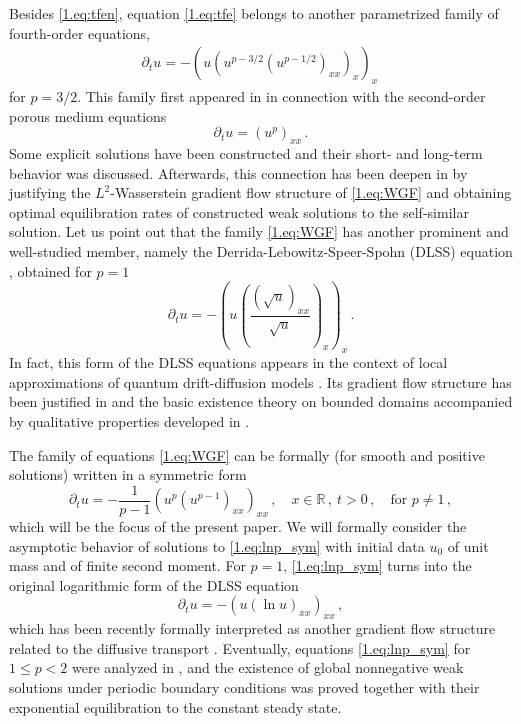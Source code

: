 \documentclass[12pt]{amsart}
\let\pa\partial
\newcommand{\R}{{\mathbb R}}
\theoremstyle{plain}
\theoremstyle{definition}
\theoremstyle{remark}
\begin{document}
Besides \eqref{1.eq:tfen}, equation \eqref{1.eq:tfe} belongs to another parametrized family of fourth-order equations, 
\begin{align}\label{1.eq:WGF}
    \pa_t u = -%
    \left(u\left(u^{p-3/2}(u^{p-1/2})_{xx}\right)_x\right)_x\,
\end{align}
for $p=3/2$. This family first appeared in \cite{DeMc08} in connection with the second-order porous medium equations  
\begin{equation*}
    \pa_tu = \left(u^p\right)_{xx}\,.
\end{equation*}
Some explicit solutions have been constructed and their short- and long-term be\-ha\-vi\-or was discussed. Afterwards, this connection has been deepen in \cite{MMS09} by justifying the $L^2$-Wasserstein gradient flow structure of \eqref{1.eq:WGF} and obtaining optimal equilibration rates of constructed weak solutions to the self-similar solution.
Let us point out that the family \eqref{1.eq:WGF} has another prominent and well-studied member, namely the Derrida-Lebowitz-Speer-Spohn (DLSS) equation \cite{DLSS91}, obtained for $p=1$ 
\begin{equation*}
    \pa_t u = -\left(u\left(\frac{(\sqrt{u})_{xx}}{\sqrt{u}}\right)_x\right)_x\,.
\end{equation*}
In fact, this form of the DLSS equations appears in the context of local approximations of quantum drift-diffusion models \cite{DMR05}. Its gradient flow structure has been justified in \cite{GST09} and the basic existence theory on bounded domains accompanied by qualitative properties developed in \cite{BLS94, CCT05, Fisch13, Fisch14, JuMa08, JuPi00}.

The family of equations \eqref{1.eq:WGF} can be formally (for smooth and positive solutions) written in a symmetric form \cite{MMS09}
\begin{equation}\label{1.eq:lnp_sym}
    \pa_t u = -\frac{1}{p-1}\left(u^p\left(u^{p-1}\right)_{xx}\right)_{xx}\,,\quad x\in\R\,,\ t>0\,,\quad\text{for } p\neq 1\,,
\end{equation}
which will be the focus of the present paper. We will formally consider the asymptotic behavior of solutions to \eqref{1.eq:lnp_sym} with initial data $u_0$ of unit mass and of finite second moment. For $p=1$, \eqref{1.eq:lnp_sym} turns into the original logarithmic form of the DLSS equation \cite{DLSS91}
\begin{equation}\label{1.eq:dlss_log}
    \pa_t u = -\left(u\left(\ln u\right)_{xx}\right)_{xx}\,, 
\end{equation}
which has been recently formally interpreted as another gradient flow structure related to the diffusive transport \cite{MRSS25, MRS25}. Eventually, equations \eqref{1.eq:lnp_sym} for $1\leq p <2$ were analyzed in \cite{Buk16}, and the existence of global nonnegative weak solutions under periodic boundary conditions was proved together with their exponential equilibration to the constant steady state.
\end{document}
